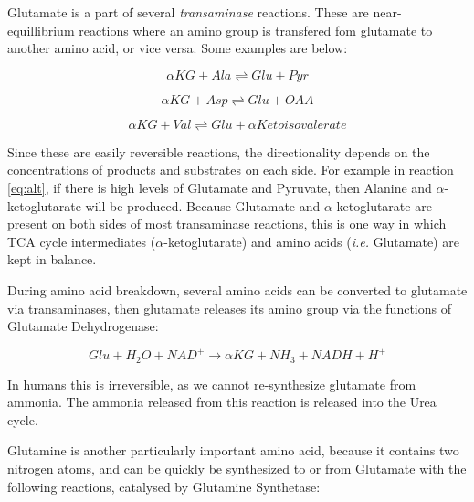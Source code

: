 \documentclass{tufte-handout}
\begin{document}
Glutamate is a part of several \emph{transaminase} reactions.  These are near-equillibrium reactions where an amino group is transfered fom glutamate to another amino acid, or vice versa.  Some examples are below:

 \begin{equation}\label{eq:alt}
\alpha KG + Ala \rightleftharpoons Glu + Pyr
\end{equation}

 \begin{equation}\label{eq:ast}
\alpha KG + Asp \rightleftharpoons Glu + OAA
\end{equation}

 \begin{equation}
\alpha KG + Val \rightleftharpoons Glu +\alpha Ketoisovalerate
\end{equation}

Since these are easily reversible reactions, the directionality depends on the concentrations of products and substrates on each side.  For example in reaction \ref{eq:alt}, if there is high levels of Glutamate and Pyruvate, then  Alanine and $\alpha$-ketoglutarate will be produced.  Because Glutamate and $\alpha$-ketoglutarate are present on both sides of most transaminase reactions, this is one way in which TCA cycle intermediates ($\alpha$-ketoglutarate) and amino acids (\textit{i.e.} Glutamate) are kept in balance.

  During amino acid breakdown, several amino acids can be converted to glutamate via transaminases, then glutamate releases its amino group via the functions of Glutamate Dehydrogenase:

\begin{equation}\label{eq:GDH}
Glu + H_2O + NAD^+  \rightarrow  \alpha KG + NH_3 + NADH + H^+
\end{equation}

In humans this is irreversible, as we cannot re-synthesize glutamate from ammonia.  The ammonia released from this reaction is released into the Urea cycle.

  Glutamine is another particularly important amino acid, because it contains two nitrogen atoms, and can be quickly be synthesized to or from Glutamate with the following reactions, catalysed by Glutamine Synthetase:
\end{document}

